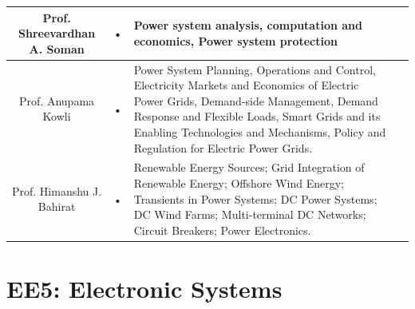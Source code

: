 \documentclass[11pt,fleqn,openany]{book} %
\begin{document}
\begin{tabular}{|c|c|p{6cm}|c}
Prof. Shreevardhan A. Soman & • & Power system analysis, computation and economics, Power system protection \\ 
\hline 
Prof. Anupama Kowli  & • & Power System Planning, Operations and Control, Electricity Markets and Economics of Electric Power Grids, Demand-side Management, Demand
Response and Flexible Loads, Smart Grids and its Enabling Technologies and Mechanisms, Policy and Regulation for Electric Power Grids. \\ 
\hline 
Prof. Himanshu J. Bahirat & • & Renewable Energy Sources; Grid Integration of Renewable Energy; Offshore Wind Energy; Transients in Power Systems; DC Power Systems;
DC Wind Farms; Multi-terminal DC Networks; Circuit Breakers; Power Electronics. \\ 
\hline 
\end{tabular} 
\section{EE5: Electronic Systems}
\end{document}
